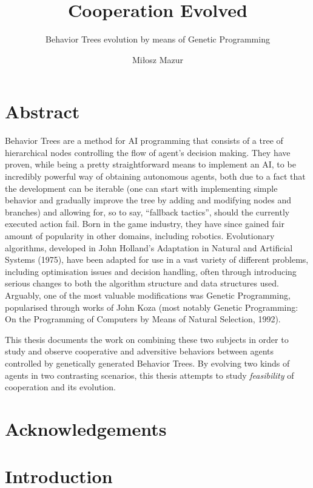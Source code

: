 \documentclass[12pt]{scrreprt}
\begin{document}
\author{Miłosz Mazur}
\title{Cooperation Evolved}
\subtitle{Behavior Trees evolution by means of Genetic Programming}
\maketitle

\newpage
\chapter*{Abstract}
Behavior Trees are a method for AI programming that consists of a tree of hierarchical nodes controlling the flow of agent's decision making. They have proven, while being a pretty straightforward means to implement an AI, to be incredibly powerful way of obtaining autonomous agents, both due to a fact that the development can be iterable (one can start with implementing simple behavior and gradually improve the tree by adding and modifying nodes and branches) and allowing for, so to say, ``fallback tactics'', should the currently executed action fail.  Born in the game industry, they have since gained fair amount of popularity in other domains, including robotics.
Evolutionary algorithms, developed in John Holland’s Adaptation in Natural and Artificial Systems (1975), have been adapted for use in a vast variety of different problems, including optimisation issues and decision handling, often through introducing serious changes to both the algorithm structure and data structures used. Arguably, one of the most valuable modifications was Genetic Programming, popularised through works of John Koza (most notably Genetic Programming: On the Programming of Computers by Means of Natural Selection, 1992).

This thesis documents the work on combining these two subjects in order to study and observe cooperative and adversitive behaviors between agents controlled by genetically generated Behavior Trees. By evolving two kinds of agents in two contrasting scenarios, this thesis attempts to study \textit{feasibility} of cooperation and its evolution. 

\chapter{Acknowledgements}
\tableofcontents
\chapter{Introduction}

\end{document}

